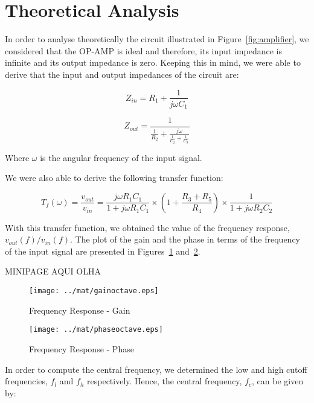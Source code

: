 \section{Theoretical Analysis}
\label{sec:analysis}

In order to analyse theoretically the circuit illustrated in Figure~\ref{fig:amplifier}, we considered that the OP-AMP is ideal and therefore, its input impedance is infinite and its output impedance is zero. Keeping this in mind, we were able to derive that the input and output impedances of the circuit are:

\begin{equation}
Z_{in}=R_1+\frac{1}{j\omega C_1}
\end{equation}

\begin{equation}
Z_{out}=\frac{1}{\frac{1}{R_2}+\frac{j\omega}{\frac{1}{C_2}+\frac{1}{C_3}}}
\end{equation}

Where $\omega$ is the angular frequency of the input signal.

We were also able to derive the following transfer function:

\begin{equation}
T_f(\omega)=\frac{v_{out}}{v_{in}}=\frac{j\omega R_1 C_1}{1+j\omega R_1 C_1}\times(1+\frac{R_3+R_5}{R_4})\times \frac{1}{1+j\omega R_2 C_2}
\end{equation}

With this transfer function, we obtained the value of the frequency response, $v_{out}(f)/v_{in}(f)$. The plot of the gain and the phase in terms of the frequency of the input signal are presented in Figures~\ref{fig:gainteo} and~\ref{fig:phaseteo}.

MINIPAGE AQUI OLHA

\begin{figure}[H] \centering
\texttt{[image: ../mat/gainoctave.eps]}
\caption{Frequency Response - Gain}
\label{fig:gainteo}
\end{figure}

\begin{figure}[H] \centering
\texttt{[image: ../mat/phaseoctave.eps]}
\caption{Frequency Response - Phase}
\label{fig:phaseteo}
\end{figure}

In order to compute the central frequency, we determined the low and high cutoff frequencies, $f_l$ and $f_h$ respectively. Hence, the central frequency, $f_c$, can be given by:

